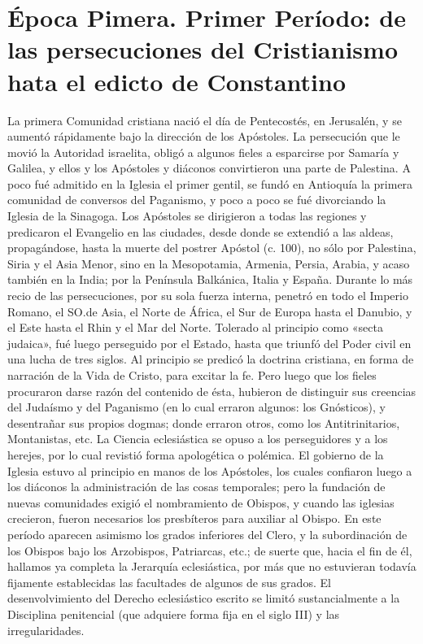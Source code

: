 \raggedbottom{} \documentclass[12pt, a4paper]{book}
\begin{document}
\part{Época Pimera. Primer Período: de las persecuciones del Cristianismo hata el edicto de Constantino}
La primera Comunidad cristiana nació el día de Pentecostés, en Jerusalén, y se aumentó rápidamente bajo la dirección de los Apóstoles. La persecución que le movió la Autoridad israelita, obligó a algunos fieles a esparcirse por Samaría y Galilea, y ellos y los Apóstoles y diáconos convirtieron una parte de Palestina. A poco fué admitido en la Iglesia el primer gentil, se fundó en Antioquía la primera comunidad de conversos del Paganismo, y poco a poco se fué divorciando la Iglesia de la Sinagoga. Los Apóstoles se dirigieron a todas las regiones y predicaron el Evangelio en las ciudades, desde donde se extendió a las aldeas, propagándose, hasta la muerte del postrer Apóstol (c. 100), no sólo por Palestina, Siria y el Asia Menor, sino en la Mesopotamia, Armenia, Persia, Arabia, y acaso también en la India; por la Península Balkánica, Italia y España. Durante lo más recio de las persecuciones, por su sola fuerza interna, penetró en todo el Imperio Romano, el SO.\@ de Asia, el Norte de África, el Sur de Europa hasta el Danubio, y el Este hasta el Rhin y el Mar del Norte. Tolerado al principio como «secta judaica», fué luego perseguido por el Estado, hasta que triunfó del Poder civil en una lucha de tres siglos. Al principio se predicó la doctrina cristiana, en forma de narración de la Vida de Cristo, para excitar la fe. Pero luego que los fieles procuraron darse razón del contenido de ésta, hubieron de distinguir sus creencias del Judaísmo y del Paganismo (en lo cual erraron algunos: los Gnósticos), y desentrañar sus propios dogmas; donde erraron otros, como los Antitrinitarios, Montanistas, etc. La Ciencia eclesiástica se opuso a los perseguidores y a los herejes, por lo cual revistió forma apologética o polémica. El gobierno de la Iglesia estuvo al principio en manos de los Apóstoles, los cuales confiaron luego a los diáconos la administración de las cosas temporales; pero la fundación de nuevas comunidades exigió el nombramiento de Obispos, y cuando las iglesias crecieron, fueron necesarios los presbíteros para auxiliar al Obispo. En este período aparecen asimismo los grados inferiores del Clero, y la subordinación de los Obispos bajo los Arzobispos, Patriarcas, etc.; de suerte que, hacia el fin de él, hallamos ya completa la Jerarquía eclesiástica, por más que no estuvieran todavía fijamente establecidas las facultades de algunos de sus grados. El desenvolvimiento del Derecho eclesiástico escrito se limitó sustancialmente a la Disciplina penitencial (que adquiere forma fija en el siglo III) y las irregularidades.
\end{document}
